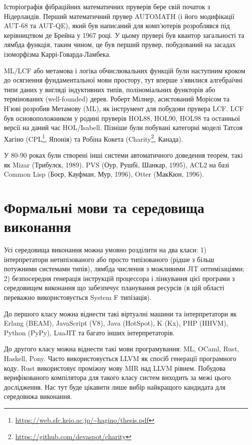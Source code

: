Історіографія фібраційних математичних пруверів бере свій початок з Нідерландів.
Перший математичний прувер AUTOMATH (і його модифікації AUT-68 та AUT-QE),
який був написаний для комп'ютерів розроблявся під керівництвом де Брейна у 1967 році.
У цьому прувері був квантор загальності та лямбда функція, таким чином, це був перший прувер,
побудований на засадах ізоморфізма Каррі-Говарда-Ламбека.

ML/LCF або метамова і логіка обчислювальних функцій були наступним кроком до
осягнення фундаментальної мови простору, тут вперше з'явилися алгебраїчні типи даних
у вигляді індуктивних типів, поліноміальних функторів або термінованих (well-founded) дерев.
Роберт Мілнер, асистований Морісом та Н'юві розробив Метамову (ML), як
інструмент для побудови прувера LCF. LCF був основоположником у родині пруверів
HOL88, HOL90, HOL98 та останньої версії на даний час HOL/Isabell.
Пізніше були побувані категорні моделі Татсоя Хагіно (CPL\footnote{\url{https://web.sfc.keio.ac.jp/~hagino/thesis.pdf}}, Японія)
та Робіна Кокета (Charity\footnote{\url{https://github.com/devaspot/charity}}, Канада).

У 80-90 роках були створені інші системи автоматичного доведення теорем,
такі як Mizar (Трибулєк, 1989). PVS (Оур, Рушбі, Шанкар, 1995),
ACL2 на базі Common Lisp (Боєр, Кауфман, Мур, 1996), Otter (МакКюн, 1996).

\section{Формальні мови та середовища виконання}
Усі середовища виконання можна умовно розділити на два класи:
1) інтерпретатори нетипізованого або просто
   типізованого (рідше з більш потужними системами типів),
   лямбда числення з можливими JIT оптимізаціями;
2) безпосередня генерація інструкцій процессора і лінкування цієї програми з
   середовищем виконання що забезпечує планування ресурсів (в цій області
   переважно використовується System F типізація).

До першого класу можна віднести такі віртуалні машини та інтерпретатори як
Erlang (BEAM), JavaScript (V8), Java (HotSpot), K (Kx), PHP (HHVM), Python (PyPy), LuaJIT
та багато інших інтерпретаторів.

До другого класу можна віднести такі мови програмування: ML, OCaml, Rust,
Haskell, Pony. Часто використовується LLVM як спосіб генерації програмного коду.
Rust використовує проміжну мову MIR над LLVM рівнем. Побудова верифікованого компілятора
для такого класу систем виходить за межі цього дослідження. Нас тут буде цікавити
лише вибір найкращого кандидата для середовижа виконання.

